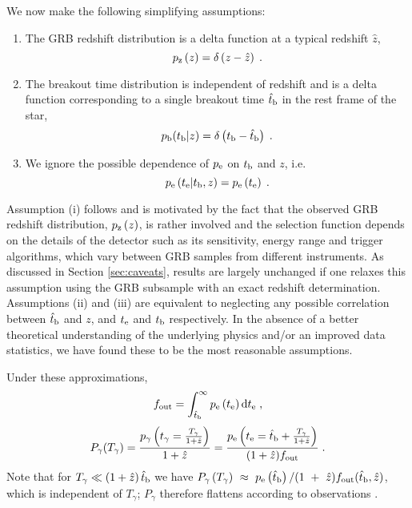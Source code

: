 \documentclass[useAMS,usenatbib]{mn2e}
\begin{document}
We now make the following simplifying assumptions:
\begin{enumerate}
\item  The GRB redshift distribution is a delta function at a typical redshift $\hat{z}$,
%
\begin{equation} 
 p_{\rm z}\left(z\right) = \delta\left( z - \hat{z}\right)\;.
\end{equation}
%
\item The breakout time distribution is independent of redshift and is a delta function corresponding to a single breakout time $\hat{t}_{\rm b}$ in the rest frame of the star,
%
\begin{equation}\label{eq:p_b}
p_{\rm b}(t_{\rm b}|z) = \delta\left(t_{\rm b} - \hat{t}_{\rm b}\right)\;.
\end{equation}
%
\item  We ignore the possible dependence of $p_{\rm e}$ on $t_{\rm b}$ and $z$, i.e. 
\begin{equation}
p_{\rm e}\left(t_{\rm e}|t_{\rm b},z\right) = p_{\rm e}\left(t_{\rm e}\right)\;.
\end{equation}
%
\end{enumerate}

Assumption (i) follows \citet{Bromberg2012} and is motivated by the fact that the observed GRB redshift distribution, $p_{\rm z}\left(z\right)$, is rather involved and the selection function depends on the details of the detector such as its sensitivity, energy range and trigger algorithms, which vary between GRB samples from different instruments. As discussed in Section \ref{sec:caveats}, results are largely unchanged if one relaxes this assumption using the GRB subsample with an exact redshift determination.
%
Assumptions (ii) and (iii) are equivalent to neglecting any possible correlation between $\hat{t}_{\rm b}$ and $z$, and $t_{\rm e}$ and $t_{\rm b}$ respectively. In the absence of a better theoretical understanding of the underlying physics and/or an improved data statistics, we have found these to be the most reasonable assumptions.

Under these approximations,
\begin{equation}\label{eq:approx1a}
f_{\rm out}=\int_{\hat{t}_{\rm b}}^\infty p_{\rm e}\left(t_{\rm e}\right)\text{d}t_{\rm e}\;,
\end{equation}
\begin{equation}\label{eq:approx1b}
P_\gamma(T_\gamma) =  \frac{p_\gamma\left(t_\gamma=\frac{T_\gamma}{1+\hat{z}}\right)}{1+\hat{z}} =
\frac{p_{\rm e}\left(t_{\rm e}=\hat{t}_{\rm b}+\frac{T_\gamma}{1+\hat{z}}\right)}{(1+\hat{z})f_{\rm out}}\;.
\end{equation}
Note that for $T_\gamma\ll \left(1+\hat{z}\right)\hat{t}_{\rm b}$ we have $P_\gamma\left(T_\gamma\right)~\approx~p_{\rm e}\left(\hat{t}_{\rm b}\right)/(1~+~\hat{z})f_{\rm out}(\hat{t}_{\rm b},\hat{z})$, which is independent of $T_\gamma$; $P_\gamma$ therefore flattens according to observations \citep[see also][]{Bromberg2012}.
\end{document}
